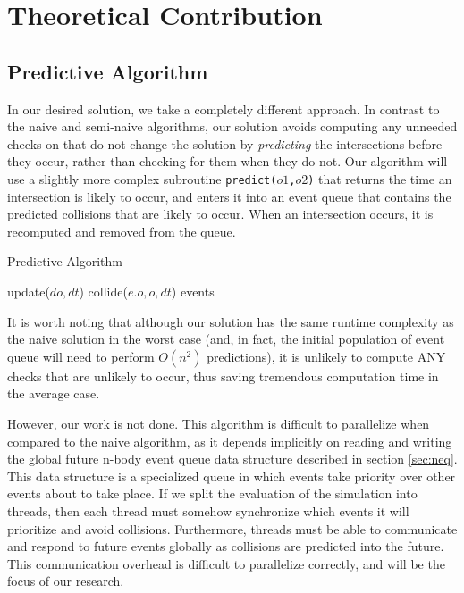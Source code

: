 \documentclass[conference]{IEEEtran}
\begin{document}
\section{Theoretical Contribution}
\label{sec:theocont}
\subsection{Predictive Algorithm}

In our desired solution, we take a completely different approach.  In contrast to the naive and semi-naive algorithms, our solution avoids computing any unneeded checks on  that do not change the solution by \textit{predicting} the intersections before they occur, rather than checking for them when they do not.  Our algorithm will use a slightly more complex subroutine \texttt{predict($o1$,$o2$)} that returns the time an intersection is likely to occur, and enters it into an event queue that contains the predicted collisions that are likely to occur.  When an intersection occurs, it is recomputed and removed from the queue.

\begin{algorithm}
\caption{Predictive Algorithm}
\begin{algorithmic}
\STATE {} %
		\STATE update($do,dt$)  
	\ENDFOR
	\STATE {}
				\STATE collide($e.o, o, dt$) 
			\ENDIF
		\ENDFOR
	\ENDFOR
\ENDFOR
\RETURN events
\end{algorithmic}
\end{algorithm}

It is worth noting that although our solution has the same runtime complexity as the naive solution in the worst case (and, in fact, the initial population of event queue will need to perform $O(n^2)$ predictions), it is unlikely to compute ANY checks that are unlikely to occur, thus saving tremendous computation time in the average case.  

However, our work is not done.  This algorithm is difficult to parallelize when compared to the naive algorithm, as it depends implicitly on reading and writing the global future n-body event queue data structure described in section \ref{sec:neq}.  This data structure is a specialized queue in which events take priority over other events about to take place. If we split the evaluation of the simulation into threads, then each thread must somehow synchronize which events it will prioritize and avoid collisions.  Furthermore, threads must be able to communicate and respond to future events  globally as collisions are predicted into the future.  This communication overhead is difficult to parallelize correctly, and will be the focus of our research.
\end{document}

